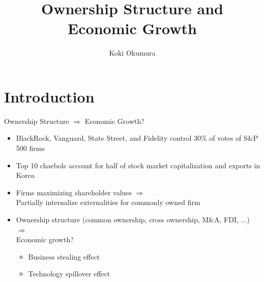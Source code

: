 \documentclass[english,aspectratio=169,handout]{beamer}
\date{}
\theoremstyle{plain}
\newcommand\makebeamertitle{%
  \date{}
  \frame{\maketitle}}
\begin{document}
\title{Ownership Structure and Economic Growth}
\author{Koki Okumura}
\makebeamertitle

\section{Introduction}

\begin{frame}{Ownership Structure $\Longrightarrow$ Economic Growth?}
  \label{intro} %
  \begin{itemize}
    \item BlackRock, Vanguard, State Street, and Fidelity control 30\% of votes
          of S\&P 500 firms \hfill \hyperlink{share}{}
    \item Top 10 chaebols account for half of stock market capitalization
          and exports in Korea
    \medskip{} \pause
    \item Firms maximizing shareholder values $\Longrightarrow$ \\
          Partially internalize externalities for commonly owned firm
    \medskip{} \pause
    \item Ownership structure (common ownership, cross ownership, M\&A, FDI, ...) $\Longrightarrow$ \\
          Economic growth?
          \begin{itemize}
            \item Business stealing effect
            \item Technology spillover effect
          \end{itemize}
  \end{itemize}
\end{frame}
\end{document}

